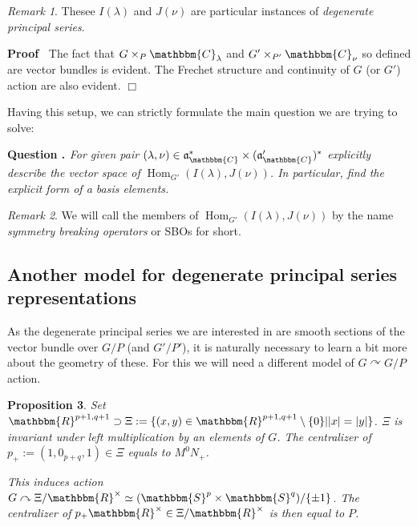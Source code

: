 \documentclass{article}
\newcommand{\assign}{:=}
\newcommand{\tmop}[1]{\ensuremath{\operatorname{#1}}}
\newcommand{\tmtextbf}[1]{{\bfseries{#1}}}
\newcommand{\tmtextit}[1]{{\itshape{#1}}}
\renewenvironment{proof}{\noindent\textbf{Proof\ }}{\hspace*{\fill}$\Box$\medskip}
\newtheorem{proposition}{Proposition}[section]
\theoremstyle{remark}
\newtheorem{remark}[proposition]{Remark}
\begin{document}
\begin{remark}
  Thesee $I (\lambda)$ and $J (\nu)$ are particular instances of
  \tmtextit{degenerate principal series}.
\end{remark}

\begin{proof}
  The fact that $G \times_P \mathbbm{C}_{\lambda}$ and $G' \times_{P'}
  \mathbbm{C}_{\nu}$ so defined are vector bundles is evident. The Frechet
  structure and continuity of $G$ (or $G'$) action are also evident.
\end{proof}

Having this setup, we can strictly formulate the main question we are trying
to solve:

{\noindent}\tmtextbf{Question . }\tmtextit{For given pair $(\lambda, \nu) \in
\mathfrak{a}_{\mathbbm{C}}^{\ast} \times (\mathfrak{a}'_{\mathbbm{C}})^{\ast}$
explicitly describe the vector space of $\tmop{Hom}_{G'} (I (\lambda), J
(\nu))$. In particular, find the explicit form of a basis
elements.}{\hspace*{\fill}}{\medskip}

\begin{remark}
  We will call the members of $\tmop{Hom}_{G'} (I (\lambda), J (\nu))$ by the
  name \tmtextit{symmetry breaking operators} or SBOs for short.
\end{remark}

\subsection{Another model for degenerate principal series representations}

As the degenerate principal series we are interested in are smooth sections of
the vector bundle over $G / P$ (and $G' / P'$), it is naturally necessary to
learn a bit more about the geometry of these. For this we will need a
different model of $G \curvearrowright G / P$ action.

\begin{proposition}
  \label{def-n-nots:prop-ximodel}Set $\mathbbm{R}^{p + 1, q + 1} \supset \Xi
  \assign \{ (x, y) \in \mathbbm{R}^{p + 1, q + 1} \setminus \{ 0 \} | | x | =
  | y | \}$. $\Xi$ is invariant under left multiplication by an elements of
  $G$. The centralizer of $p_+ \assign (1, 0_{p + q}, 1) \in \Xi$ equals to
  $M^0 N_+$.
  
  This induces action $G \curvearrowright \Xi /\mathbbm{R}^{\times} \simeq
  (\mathbbm{S}^p \times \mathbbm{S}^q) / \{ \pm 1 \}$. The centralizer of $p_+
  \mathbbm{R}^{\times} \in \Xi /\mathbbm{R}^{\times}$ is then equal to $P$.
\end{proposition}
\end{document}
